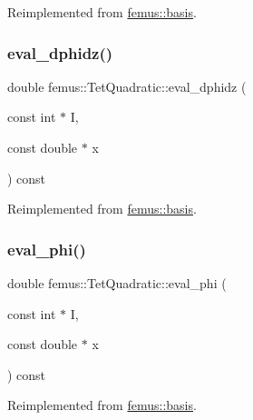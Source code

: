 Reimplemented from \mbox{\hyperlink{classfemus_1_1basis_a2819fac9aae797156b9efec8a0b85cc1}{femus\+::basis}}.

\mbox{\label{classfemus_1_1_tet_quadratic_a82790f3f2440511a79ae29447a112fb8}} 
\subsubsection{\texorpdfstring{eval\+\_\+dphidz()}{eval\_dphidz()}}
{\footnotesize\ttfamily double femus\+::\+Tet\+Quadratic\+::eval\+\_\+dphidz (\begin{DoxyParamCaption}\item[{const int $\ast$}]{I,  }\item[{const double $\ast$}]{x }\end{DoxyParamCaption}) const\hspace{0.3cm}{\ttfamily [virtual]}}



Reimplemented from \mbox{\hyperlink{classfemus_1_1basis_affd9927f6e25e264108219d862b8cb3d}{femus\+::basis}}.

\mbox{\label{classfemus_1_1_tet_quadratic_a7eb28afedc6c1d5dde273832b37c6936}} 
\subsubsection{\texorpdfstring{eval\+\_\+phi()}{eval\_phi()}}
{\footnotesize\ttfamily double femus\+::\+Tet\+Quadratic\+::eval\+\_\+phi (\begin{DoxyParamCaption}\item[{const int $\ast$}]{I,  }\item[{const double $\ast$}]{x }\end{DoxyParamCaption}) const\hspace{0.3cm}{\ttfamily [virtual]}}



Reimplemented from \mbox{\hyperlink{classfemus_1_1basis_a89b0797cdccffae5ff6d059b32016ae5}{femus\+::basis}}.

